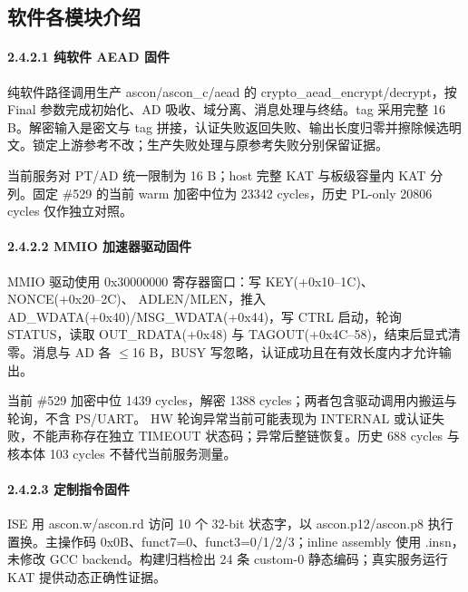 \Needspace{85pt}

\subsection{软件各模块介绍}

\Needspace{85pt}

\paragraph{2.4.2.1 纯软件 AEAD 固件}\label{ux7eafux8f6fux4ef6-aead-ux56faux4ef6}

纯软件路径调用生产 ascon/ascon\_c/aead 的 crypto\_aead\_encrypt/decrypt，按 Final 参数完成初始化、AD 吸收、域分离、消息处理与终结。tag 采用完整 16 B。解密输入是密文与 tag 拼接，认证失败返回失败、输出长度归零并擦除候选明文。锁定上游参考不改；生产失败处理与原参考失败分别保留证据。

当前服务对 PT/AD 统一限制为 16 B；host 完整 KAT 与板级容量内 KAT 分列。固定 \#529 的当前 warm 加密中位为 23342 cycles，历史 PL-only 20806 cycles 仅作独立对照。

\Needspace{85pt}

\paragraph{2.4.2.2 MMIO 加速器驱动固件}\label{mmio-ux52a0ux901fux5668ux9a71ux52a8ux56faux4ef6}

MMIO 驱动使用 0x30000000 寄存器窗口：写 KEY(+0x10--1C)、NONCE(+0x20--2C)、 ADLEN/MLEN，推入 AD\_WDATA(+0x40)/MSG\_WDATA(+0x44)，写 CTRL 启动，轮询 STATUS，读取 OUT\_RDATA(+0x48) 与 TAGOUT(+0x4C--58)，结束后显式清零。消息与 AD 各 $\leq$16 B，BUSY 写忽略，认证成功且在有效长度内才允许输出。

当前 \#529 加密中位 1439 cycles，解密 1388 cycles；两者包含驱动调用内搬运与轮询，不含 PS/UART。 HW 轮询异常当前可能表现为 INTERNAL 或认证失败，不能声称存在独立 TIMEOUT 状态码；异常后整链恢复。历史 688 cycles 与核本体 103 cycles 不替代当前服务测量。

\Needspace{85pt}

\paragraph{2.4.2.3 定制指令固件}

ISE 用 ascon.w/ascon.rd 访问 10 个 32-bit 状态字，以 ascon.p12/ascon.p8 执行置换。主操作码 0x0B、funct7=0、funct3=0/1/2/3；inline assembly 使用 .insn，未修改 GCC backend。构建归档检出 24 条 custom-0 静态编码；真实服务运行 KAT 提供动态正确性证据。

